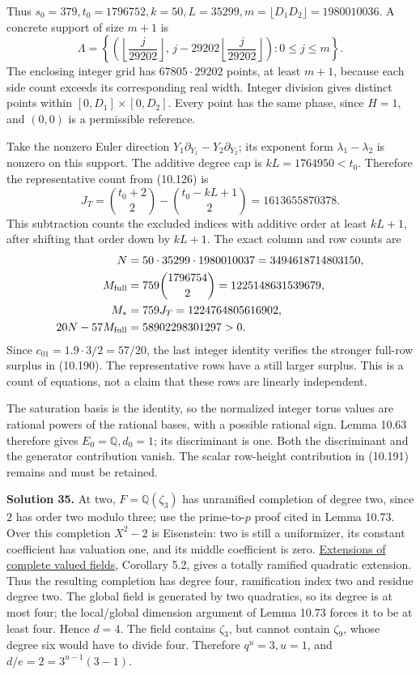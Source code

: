 \documentclass[
  11pt,
  a4paper,
]{article}
\begin{document}
Thus
\(s_0=379,t_0=1796752,k=50,L=35299,m=\lfloor D_1D_2\rfloor=1980010036\).
A concrete support of size \(m+1\) is \[
\Lambda=\left\{\left(\left\lfloor\frac j{29202}\right\rfloor,\,
j-29202\left\lfloor\frac j{29202}\right\rfloor\right):0\le j\le m\right\}.
\] The enclosing integer grid has \(67805\cdot29202\) points, at least
\(m+1\), because each side count exceeds its corresponding real width.
Integer division gives distinct points within \([0,D_1]\times[0,D_2]\).
Every point has the same phase, since \(H=1\), and \((0,0)\) is a
permissible reference.

Take the nonzero Euler direction
\(Y_1\partial_{Y_1}-Y_2\partial_{Y_2}\); its exponent form
\(\lambda_1-\lambda_2\) is nonzero on this support. The additive degree
cap is \(kL=1764950<t_0\). Therefore the representative count from
(10.126) is \[
J_T=\binom{t_0+2}{2}-\binom{t_0-kL+1}{2}
=1613655870378.
\] This subtraction counts the excluded indices with additive order at
least \(kL+1\), after shifting that order down by \(kL+1\). The exact
column and row counts are \[
\begin{aligned}
N&=50\cdot35299\cdot1980010037=3494618714803150,\\
M_{\rm full}&=759\binom{1796754}{2}=1225148631539679,\\
M_*&=759J_T=1224764805616902,\\
20N-57M_{\rm full}&=58902298301297>0.
\end{aligned}
\] Since \(c_{01}=1.9\cdot3/2=57/20\), the last integer identity
verifies the stronger full-row surplus in (10.190). The representative
rows have a still larger surplus. This is a count of equations, not a
claim that these rows are linearly independent.

The saturation basis is the identity, so the normalized integer torus
values are rational powers of the rational bases, with a possible
rational sign. Lemma 10.63 therefore gives \(E_0=\mathbb Q,d_0=1\); its
discriminant is one. Both the discriminant and the generator
contribution vanish. The scalar row-height contribution in (10.191)
remains and must be retained.

\textbf{Solution 35.} At two, \(F=\mathbb Q(\zeta_3)\) has unramified
completion of degree two, since \(2\) has order two modulo three; use
the prime-to-\(p\) proof cited in Lemma 10.73. Over this completion
\(X^2-2\) is Eisenstein: two is still a uniformizer, its constant
coefficient has valuation one, and its middle coefficient is zero.
\href{../../NT-LOC/NT-LOC-04.html\#5-root-valuations-in-the-coefficients}{Extensions
of complete valued fields}, Corollary 5.2, gives a totally ramified
quadratic extension. Thus the resulting completion has degree four,
ramification index two and residue degree two. The global field is
generated by two quadratics, so its degree is at most four; the
local/global dimension argument of Lemma 10.73 forces it to be at least
four. Hence \(d=4\). The field contains \(\zeta_3\), but cannot contain
\(\zeta_9\), whose degree six would have to divide four. Therefore
\(q^u=3,u=1\), and \(d/e=2=3^{u-1}(3-1)\).
\end{document}
